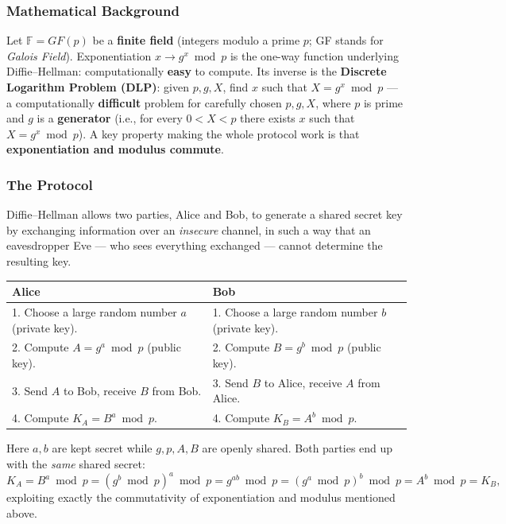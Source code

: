 \documentclass[12pt, a4paper]{article}
\begin{document}
\subsubsection{Mathematical Background}
Let $\mathbb{F}=GF(p)$ be a \textbf{finite field} (integers modulo a prime $p$; GF stands for \textit{Galois Field}). Exponentiation $x \to g^x \bmod p$ is the one-way function underlying Diffie--Hellman: computationally \textbf{easy} to compute. Its inverse is the \textbf{Discrete Logarithm Problem (DLP)}: given $p,g,X$, find $x$ such that $X = g^x \bmod p$ --- a computationally \textbf{difficult} problem for carefully chosen $p,g,X$, where $p$ is prime and $g$ is a \textbf{generator} (i.e., for every $0<X<p$ there exists $x$ such that $X=g^x \bmod p$). A key property making the whole protocol work is that \textbf{exponentiation and modulus commute}.

\subsubsection{The Protocol}
Diffie--Hellman allows two parties, Alice and Bob, to generate a shared secret key by exchanging information over an \emph{insecure} channel, in such a way that an eavesdropper Eve --- who sees everything exchanged --- cannot determine the resulting key.

\begin{center}
\begin{tabular}{@{}p{6.7cm}p{6.7cm}@{}}
\toprule
\textbf{Alice} & \textbf{Bob} \\
\midrule
1. Choose a large random number $a$ (private key). & 1. Choose a large random number $b$ (private key). \\
2. Compute $A = g^a \bmod p$ (public key). & 2. Compute $B = g^b \bmod p$ (public key). \\
3. Send $A$ to Bob, receive $B$ from Bob. & 3. Send $B$ to Alice, receive $A$ from Alice. \\
4. Compute $K_A = B^a \bmod p$. & 4. Compute $K_B = A^b \bmod p$. \\
\bottomrule
\end{tabular}
\end{center}

Here $a,b$ are kept secret while $g,p,A,B$ are openly shared. Both parties end up with the \emph{same} shared secret:
\[
K_A = B^a \bmod p = (g^b \bmod p)^a \bmod p = g^{ab} \bmod p = (g^a \bmod p)^b \bmod p = A^b \bmod p = K_B,
\]
exploiting exactly the commutativity of exponentiation and modulus mentioned above.
\end{document}
